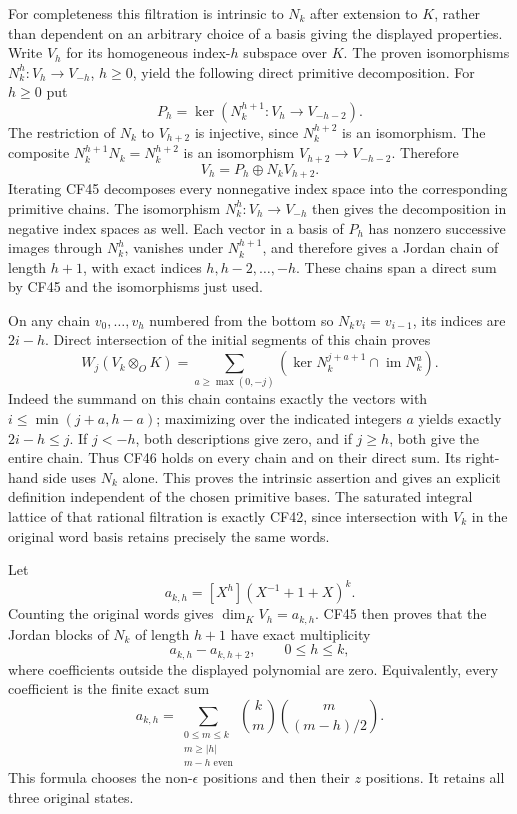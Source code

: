 \documentclass[
  10pt,
]{article}
\begin{document}
For completeness this filtration is intrinsic to \(N_k\) after extension
to \(K\), rather than dependent on an arbitrary choice of a basis giving
the displayed properties. Write \(V_h\) for its homogeneous index-\(h\)
subspace over \(K\). The proven isomorphisms \(N_k^h:V_h\to V_{-h}\),
\(h\geq0\), yield the following direct primitive decomposition. For
\(h\geq0\) put \[
 P_h=\ker(N_k^{h+1}:V_h\longrightarrow V_{-h-2}).
\] The restriction of \(N_k\) to \(V_{h+2}\) is injective, since
\(N_k^{h+2}\) is an isomorphism. The composite
\(N_k^{h+1}N_k=N_k^{h+2}\) is an isomorphism \(V_{h+2}\to V_{-h-2}\).
Therefore \[
 V_h=P_h\oplus N_kV_{h+2}.
 \tag{CF45}
\] Iterating CF45 decomposes every nonnegative index space into the
corresponding primitive chains. The isomorphism \(N_k^h:V_h\to V_{-h}\)
then gives the decomposition in negative index spaces as well. Each
vector in a basis of \(P_h\) has nonzero successive images through
\(N_k^h\), vanishes under \(N_k^{h+1}\), and therefore gives a Jordan
chain of length \(h+1\), with exact indices \(h,h-2,\ldots,-h\). These
chains span a direct sum by CF45 and the isomorphisms just used.

On any chain \(v_0,\ldots,v_h\) numbered from the bottom so
\(N_kv_i=v_{i-1}\), its indices are \(2i-h\). Direct intersection of the
initial segments of this chain proves \[
 W_j(V_k\otimes_OK)=
 \sum_{a\geq\max(0,-j)}
 \left(\ker N_k^{j+a+1}\cap\operatorname{im}N_k^a\right).
 \tag{CF46}
\] Indeed the summand on this chain contains exactly the vectors with
\(i\leq\min(j+a,h-a)\); maximizing over the indicated integers \(a\)
yields exactly \(2i-h\leq j\). If \(j<-h\), both descriptions give zero,
and if \(j\geq h\), both give the entire chain. Thus CF46 holds on every
chain and on their direct sum. Its right-hand side uses \(N_k\) alone.
This proves the intrinsic assertion and gives an explicit definition
independent of the chosen primitive bases. The saturated integral
lattice of that rational filtration is exactly CF42, since intersection
with \(V_k\) in the original word basis retains precisely the same
words.

Let \[
 a_{k,h}=[X^h](X^{-1}+1+X)^k.
\] Counting the original words gives \(\dim_KV_h=a_{k,h}\). CF45 then
proves that the Jordan blocks of \(N_k\) of length \(h+1\) have exact
multiplicity \[
 a_{k,h}-a_{k,h+2},\qquad0\leq h\leq k,
 \tag{CF47}
\] where coefficients outside the displayed polynomial are zero.
Equivalently, every coefficient is the finite exact sum \[
 a_{k,h}=
 \sum_{\substack{0\leq m\leq k\\m\geq|h|\\m-h\text{ even}}}
 \binom km\binom m{(m-h)/2}.
 \tag{CF48}
\] This formula chooses the non-\(\epsilon\) positions and then their
\(z\) positions. It retains all three original states.
\end{document}
